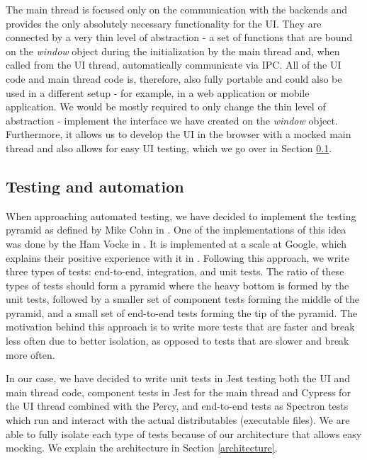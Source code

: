 \documentclass[thesismargins, english, thesislinespacing, onelinechapterstyle, upjsfrontpage]{rnthesis}
\begin{document}
The main thread is focused only on the communication with the backends and provides the only absolutely necessary functionality for the UI.
They are connected by a very thin level of abstraction - a set of functions that are bound on the \textit{window} object during the initialization by the main thread and, when called from the UI thread, automatically communicate via IPC.
All of the UI code and main thread code is, therefore, also fully portable and could also be used in a different setup - for example, in a web application or mobile application.
We would be mostly required to only change the thin level of abstraction - implement the interface we have created on the \textit{window} object.
Furthermore, it allows us to develop the UI in the browser with a mocked main thread and also allows for easy UI testing, which we go over in Section \ref{testing}.

\subsection{Testing and automation} \label{testing}

When approaching automated testing, we have decided to implement the testing pyramid as defined by Mike Cohn in \cite{succeedingagile}.
One of the implementations of this idea was done by the Ham Vocke in \cite{practicalpyramid}.
It is implemented at a scale at Google, which explains their positive experience with it in \cite{nomoree2e}.
Following this approach, we write three types of tests: end-to-end, integration, and unit tests.
The ratio of these types of tests should form a pyramid where the heavy bottom is formed by the unit tests, followed by a smaller set of component tests forming the middle of the pyramid, and a small set of end-to-end tests forming the tip of the pyramid.
The motivation behind this approach is to write more tests that are faster and break less often due to better isolation, as opposed to tests that are slower and break more often.

In our case, we have decided to write unit tests in Jest testing both the UI and main thread code, component tests in Jest for the main thread and Cypress for the UI thread combined with the Percy, and end-to-end tests as Spectron tests which run and interact with the actual distributables (executable files).
We are able to fully isolate each type of tests because of our architecture that allows easy mocking.
We explain the architecture in Section \ref{architecture}.
\end{document}
